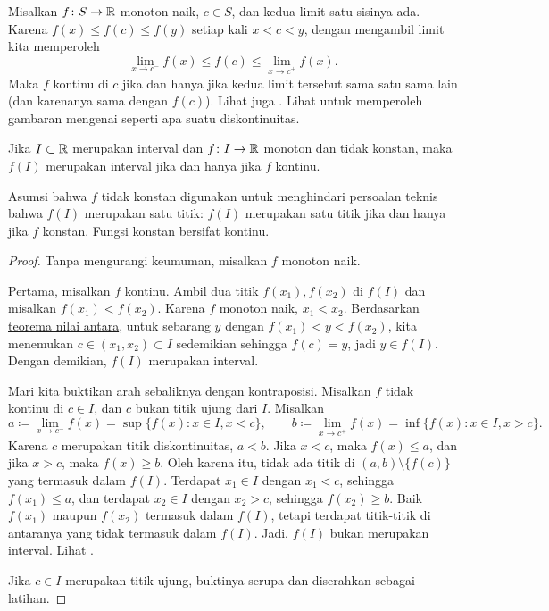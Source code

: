 Misalkan $f \colon S \to {\mathbb{R}}$ monoton naik, $c \in S$, dan
kedua limit satu sisinya ada.
Karena $f(x) \leq f(c) \leq f(y)$
setiap kali $x < c < y$, dengan mengambil limit kita memperoleh
\begin{equation*}
\lim_{x \to c^-} f(x) \leq f(c) \leq \lim_{x \to c^+} f(x) .
\end{equation*}
Maka $f$ kontinu di $c$ jika dan hanya jika kedua limit tersebut sama
satu sama lain (dan karenanya sama dengan $f(c)$).  Lihat juga
.
Lihat  untuk memperoleh gambaran mengenai seperti apa
suatu diskontinuitas.


\begin{cor} \label{cor:continterval}
Jika $I \subset {\mathbb{R}}$ merupakan interval dan $f \colon I \to {\mathbb{R}}$ 
monoton dan tidak konstan, maka $f(I)$ merupakan interval jika dan hanya jika $f$
kontinu.
\end{cor}

Asumsi bahwa $f$ tidak konstan digunakan untuk menghindari persoalan teknis
bahwa $f(I)$ merupakan satu titik: $f(I)$ merupakan satu
titik jika dan hanya jika $f$ konstan.  Fungsi konstan bersifat 
kontinu.

\begin{proof}
Tanpa mengurangi keumuman, misalkan $f$ monoton naik.

Pertama, misalkan $f$ kontinu.  Ambil dua titik
$f(x_1), f(x_2)$ di $f(I)$ dan misalkan
$f(x_1) < f(x_2)$.
Karena $f$ monoton naik, $x_1 < x_2$.  Berdasarkan
\hyperref[IVT:thm]{teorema nilai antara},
untuk sebarang $y$ dengan $f(x_1) < y < f(x_2)$, kita menemukan
$c \in (x_1,x_2) \subset I$ sedemikian sehingga $f(c) = y$, jadi $y \in f(I)$. 
Dengan demikian, $f(I)$ merupakan interval.

Mari kita buktikan arah sebaliknya dengan kontraposisi.
Misalkan $f$ tidak kontinu di $c \in I$,
dan $c$ bukan titik ujung dari $I$.
Misalkan
\begin{equation*}
a
\coloneqq \lim_{x \to c^-} f(x) = \sup \bigl\{ f(x) : x \in I, x < c \bigr\} ,
\qquad
b
\coloneqq \lim_{x \to c^+} f(x) = \inf \bigl\{ f(x) : x \in I, x > c \bigr\} .
\end{equation*}
Karena $c$ merupakan titik diskontinuitas, $a < b$.
Jika $x < c$, maka $f(x) \leq a$, dan
jika $x > c$, maka $f(x) \geq b$.  Oleh karena itu,
tidak ada titik
di $(a,b) \setminus \bigl\{ f(c) \bigr\}$ yang termasuk dalam $f(I)$.
Terdapat $x_1 \in I$ dengan $x_1 < c$, sehingga
$f(x_1) \leq a$, dan terdapat $x_2 \in I$ dengan $x_2 > c$,
sehingga $f(x_2) \geq b$.  Baik $f(x_1)$ maupun $f(x_2)$ termasuk dalam $f(I)$,
tetapi terdapat titik-titik di antaranya yang tidak termasuk dalam $f(I)$.
Jadi, $f(I)$ bukan merupakan interval.  Lihat .

Jika $c \in I$ merupakan titik ujung, buktinya serupa dan diserahkan sebagai latihan.
\end{proof}

